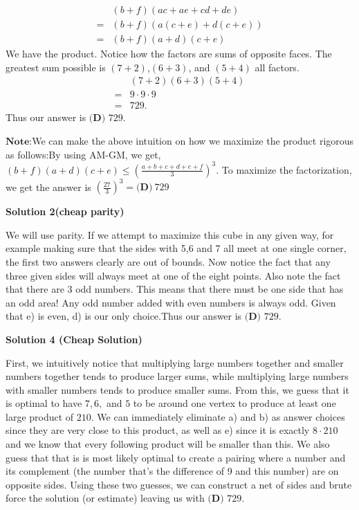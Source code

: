 \begin{enumerate}
 
 \begin{align*} & (b+f)(ac+ae+cd+de) \\ = &(b+f)(a(c+e)+d(c+e)) \\ = &(b+f)(a+d)(c+e) \end{align*}
We have the product. Notice how the factors are sums of opposite faces. The greatest sum possible is $(7+2)$,$(6+3)$, and $(5+4)$ all factors.
 \begin{align*} & (7+2)(6+3)(5+4) \\ = & 9 \cdot 9 \cdot 9 \\ = & 729. \end{align*}
Thus our answer is $\boxed{\textbf{(D) }729}$.

 $\textbf{Note:}$We can make the above intuition on how we maximize the product rigorous as follows:By using AM-GM, we get, $(b+f)(a+d)(c+e) \le \left( \frac{a+b+c+d+e+f}{3} \right)^3$. To maximize the factorization, we get the answer is $\left( \frac{27}{3} \right)^3 = \boxed{\textbf{(D)}\ 729}$




\textbf{Solution 2(cheap parity)}

We will use parity. If we attempt to maximize this cube in any given way, for example making sure that the sides with 5,6 and 7 all meet at one single corner, the first two answers clearly are out of bounds. Now notice the fact that any three given sides will always meet at one of the eight points. Also note the fact that there are 3 odd numbers. This means that there must be one side that has an odd area! Any odd number added with even numbers is always odd. Given that e) is even, d) is our only choice.Thus our answer is $\boxed{\textbf{(D) }729}$.

 



\textbf{Solution 4 (Cheap Solution)}

First, we intuitively notice that multiplying large numbers together and smaller numbers together tends to produce larger sums, while multiplying large numbers with smaller numbers tends to produce smaller sums. From this, we guess that it is optimal to have $7, 6,$ and $5$ to be around one vertex to produce at least one large product of $210$. We can immediately eliminate a) and b) as answer choices since they are very close to this product, as well as e) since it is exactly $8 \cdot 210$ and we know that every following product will be smaller than this. We also guess that that is is most likely optimal to create a pairing where a number and its complement (the number that's the difference of 9 and this number) are on opposite sides. Using these two guesses, we can construct a net of sides and brute force the solution (or estimate) leaving us with $\boxed{\textbf{(D) }729}$.


\end{enumerate}
